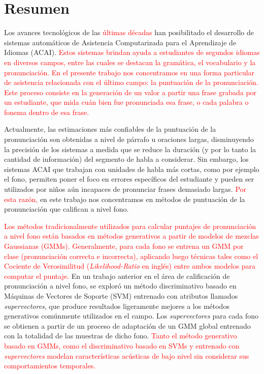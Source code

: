 \chapter*{Resumen}

Los avances tecnológicos de las \textcolor{red}{últimas décadas} han
posibilitado el desarrollo de sistemas
automáticos de Asistencia Computarizada para el Aprendizaje de Idiomas (ACAI).
\textcolor{red}{Estos sistemas brindan ayuda a estudiantes de segundos idiomas
en diversos campos, entre las cuales se destacan la gramática, el vocabulario
y la pronunciación. En el presente trabajo nos concentramos en una forma
particular de asistencia relacionada con el último campo: la puntuación
de la pronunciación. Este proceso consiste en la generación de un valor
a partir una frase grabada por un estudiante, que mida cuán bien
fue pronunciada esa frase,
o cada palabra o fonema dentro de esa frase.}

Actualmente, las estimaciones más confiables de la puntuación de la pronunciación
son obtenidas a nivel de párrafo u oraciones largas, disminuyendo la precisión
de los sistemas a medida que se reduce la duración
(y por lo tanto la cantidad de información) del segmento de habla a considerar.
Sin embargo, los sistemas ACAI que trabajan con unidades de habla
más cortas, como por ejemplo el fono,
permiten poner el foco en errores específicos del estudiante y
pueden ser utilizados por niños aún incapaces de pronunciar frases
demasiado largas. \textcolor{red}{Por esta razón,}
en este trabajo nos concentramos en métodos de puntuación de la pronunciación
que califican a nivel fono.

\textcolor{red}{Los métodos tradicionalmente utilizados para calcular
puntajes de pronunciación a nivel fono
están basados en métodos generativos a partir de
modelos de mezclas Gaussianas (GMMs). Generalmente,
para cada fono se
entrena un GMM por clase (pronunciación correcta e incorrecta),
aplicando luego técnicas tales como el Cociente de
Verosimilitud (\textit{Likelihood-Ratio} en inglés) entre ambos modelos para
computar el puntaje.} En un trabajo anterior en
el área de calificación de pronunciación a nivel fono,
se exploró
un método discriminativo basado en Máquinas de Vectores de Soporte (SVM) entrenado
con atributos llamados \textit{supervectores}, que produce resultados
ligeramente mejores a los métodos generativos comúnmente utilizados en el campo.
Los \textit{supervectores} para cada fono se obtienen
a partir de un proceso de adaptación de un
GMM global entrenado con la totalidad
de las muestras de dicho fono. \textcolor{red}{
Tanto el método generativo basado en GMMs,
como el discriminativo basado en SVMs y entrenado con \textit{supervectores}
modelan características acústicas
de bajo nivel sin considerar sus comportamientos temporales.}

